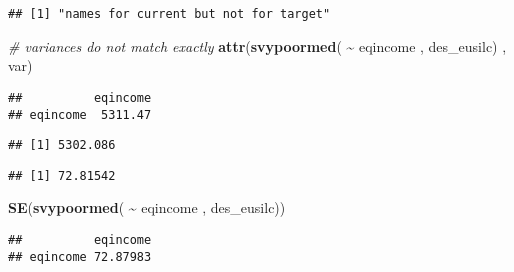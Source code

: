 \documentclass[
]{book}
\newenvironment{Shaded}{\begin{snugshade}}{\end{snugshade}}
\newcommand{\CommentTok}[1]{\textcolor[rgb]{0.56,0.35,0.01}{\textit{#1}}}
\newcommand{\FunctionTok}[1]{\textcolor[rgb]{0.13,0.29,0.53}{\textbf{#1}}}
\newcommand{\NormalTok}[1]{#1}
\newcommand{\SpecialCharTok}[1]{\textcolor[rgb]{0.81,0.36,0.00}{\textbf{#1}}}
\newcommand{\StringTok}[1]{\textcolor[rgb]{0.31,0.60,0.02}{#1}}
\begin{document}
\begin{verbatim}
## [1] "names for current but not for target"
\end{verbatim}

\begin{Shaded}
\begin{Highlighting}[]
\CommentTok{\# variances do not match exactly}
\FunctionTok{attr}\NormalTok{(}\FunctionTok{svypoormed}\NormalTok{( }\SpecialCharTok{\textasciitilde{}}\NormalTok{ eqincome , des\_eusilc) , }\StringTok{\textquotesingle{}var\textquotesingle{}}\NormalTok{)}
\end{Highlighting}
\end{Shaded}

\begin{verbatim}
##          eqincome
## eqincome  5311.47
\end{verbatim}

\begin{Shaded}
\end{Shaded}

\begin{verbatim}
## [1] 5302.086
\end{verbatim}

\begin{Shaded}
\end{Shaded}

\begin{verbatim}
## [1] 72.81542
\end{verbatim}

\begin{Shaded}
\begin{Highlighting}[]
\FunctionTok{SE}\NormalTok{(}\FunctionTok{svypoormed}\NormalTok{( }\SpecialCharTok{\textasciitilde{}}\NormalTok{ eqincome , des\_eusilc))}
\end{Highlighting}
\end{Shaded}

\begin{verbatim}
##          eqincome
## eqincome 72.87983
\end{verbatim}
\end{document}
